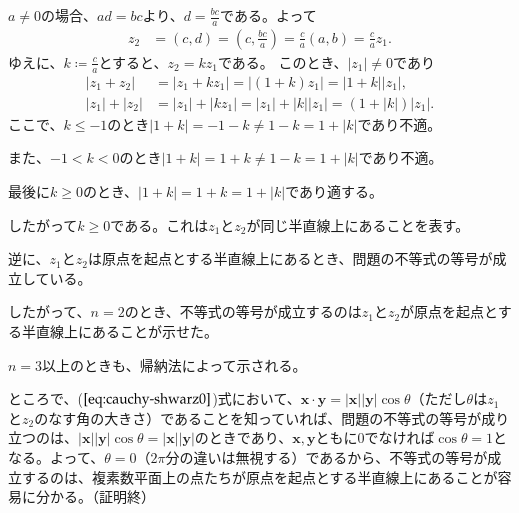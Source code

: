 $a\neq 0$の場合、$ad=bc$より、$d=\frac{bc}{a}$である。よって
\begin{align*}
    z_2&=(c,d)=\left(c,\frac{bc}{a}\right)
    =\frac{c}{a}(a,b)=\frac{c}{a}z_1.
\end{align*}
ゆえに、$k\coloneqq\frac{c}{a}$とすると、$z_2=kz_1$である。
このとき、$|z_1|\neq 0$であり
\begin{align*}
    |z_1+z_2|&=|z_1+kz_1|
    =|(1+k)z_1|=|1+k||z_1|,\\
    |z_1|+|z_2|&=|z_1|+|kz_1|
    =|z_1|+|k||z_1|=(1+|k|)|z_1|.
\end{align*}
ここで、$k\le -1$のとき$|1+k|=-1-k\neq 1-k=1+|k|$であり不適。

また、$-1<k<0$のとき$|1+k|=1+k\neq 1-k=1+|k|$であり不適。

最後に$k\ge 0$のとき、$|1+k|=1+k=1+|k|$であり適する。

したがって$k\ge 0$である。これは$z_1$と$z_2$が同じ半直線上にあることを表す。
%
%

逆に、$z_1$と$z_2$は原点を起点とする半直線上にあるとき、問題の不等式の等号が成立している。

したがって、$n=2$のとき、不等式の等号が成立するのは$z_1$と$z_2$が原点を起点とする半直線上にあることが示せた。

$n=3$以上のときも、帰納法によって示される。

ところで、($\ref{eq:cauchy-shwarz0}$)式において、$\bm{x}\cdot \bm{y}=|\bm{x}||\bm{y}|\cos \theta$（ただし$\theta$は$z_1$と$z_2$のなす角の大きさ）であることを知っていれば、問題の不等式の等号が成り立つのは、$|\bm{x}||\bm{y}|\cos \theta=|\bm{x}||\bm{y}|$のときであり、$\bm{x}, \bm{y}$ともに0でなければ$\cos \theta=1$となる。よって、$\theta=0$（$2\pi$分の違いは無視する）であるから、不等式の等号が成立するのは、複素数平面上の点たちが原点を起点とする半直線上にあることが容易に分かる。（証明終）

